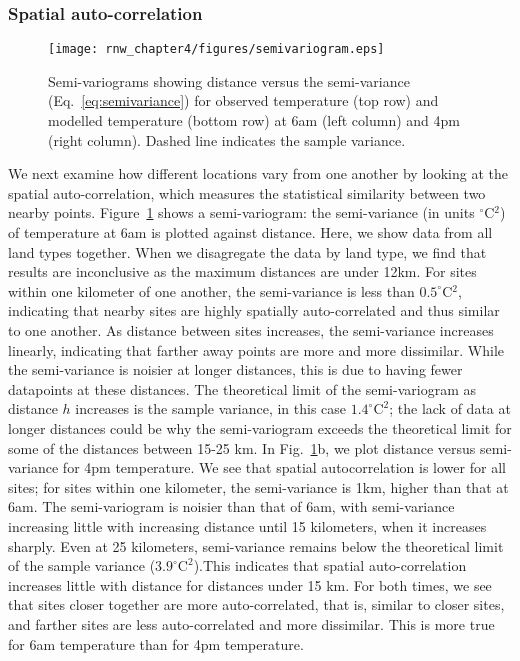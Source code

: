 	\subsubsection{Spatial auto-correlation}
\begin{figure}
\centering
\texttt{[image: rnw\_chapter4/figures/semivariogram.eps]}
\caption{Semi-variograms showing distance versus the semi-variance (Eq.~\ref{eq:semivariance}) for observed temperature (top row) and modelled temperature (bottom row) at 6am (left column) and 4pm (right column). Dashed line indicates the sample variance. 
}\label{fig:semiv_obs}
\end{figure}
We next examine how different locations vary from one another by looking at the spatial auto-correlation, which measures the statistical similarity between two nearby points. Figure~\ref{fig:semiv_obs} shows a semi-variogram: the semi-variance (in units $^\circ$C$^2$) of temperature at 6am is plotted against distance. Here, we show data from all land types together. When we disagregate the data by land type, we find that results are inconclusive as the maximum distances are under 12km. 
For sites within one kilometer of one another, the semi-variance is less than $0.5^\circ$C$^2$, indicating that nearby sites are highly spatially auto-correlated and thus similar to one another. 
As distance between sites increases, the semi-variance increases linearly, indicating that farther away points are more and more dissimilar. While the semi-variance is noisier at longer distances, this is due to having fewer datapoints at these distances. 
The theoretical limit of the semi-variogram as distance $h$ increases is the sample variance, in this case $1.4^{\circ} \text{C} ^2$; the lack of data at longer distances could be why the semi-variogram exceeds the theoretical limit for some of the distances between 15-25 km. 
In Fig.~\ref{fig:semiv_obs}b, we plot distance versus semi-variance for 4pm temperature. We see that spatial autocorrelation is lower for all sites; for sites within one kilometer, the semi-variance is 1km, higher than that at 6am. The semi-variogram is noisier than that of 6am, with semi-variance increasing little with increasing distance until 15 kilometers, when it increases sharply. Even at 25 kilometers, semi-variance remains below the theoretical limit of the sample variance ($3.9^\circ \text{C}^2$).This indicates that spatial auto-correlation increases little with distance for distances under 15 km.
For both times, we see that sites closer together are more auto-correlated, that is, similar to closer sites, and farther sites are less auto-correlated and more dissimilar. This is more true for 6am temperature than for 4pm temperature. 

